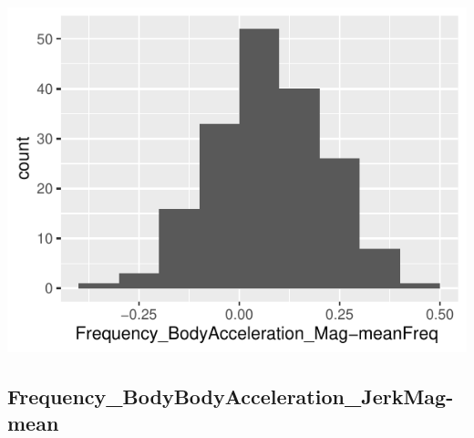 \documentclass[
]{article}
\begin{document}
\begin{minipage}{0.25 \textwidth}

\includegraphics{codebook_tidydatasub_files/figure-latex/Var-72-Frequency-BodyAcceleration-Mag-meanFreq--1.pdf}

\end{minipage}

\noindent\makebox[\linewidth]{\rule{\textwidth}{0.4pt}}

\hypertarget{frequency_bodybodyacceleration_jerkmag-mean}{%
\subsection{Frequency\_BodyBodyAcceleration\_JerkMag-mean}\label{frequency_bodybodyacceleration_jerkmag-mean}}
\end{document}
